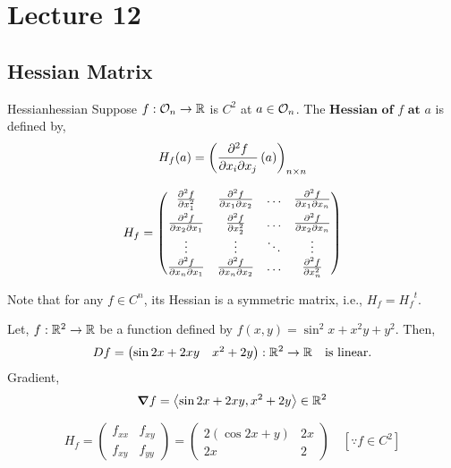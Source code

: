 \documentclass[../Analysis-3.tex]{subfiles}
\begin{document}
\chapter*{Lecture 12} %
\setcounter{chapter}{12} %
\setcounter{section}{0}

\section{Hessian Matrix}

\begin{Def}{Hessian}{hessian}
  Suppose $f : \mathcal{O}_{n} \to \mathbb{R}$ is $C^2$ at $a \in \mathcal{O}_{n} $. The $\textbf{Hessian of $f$ at $a$}$ is defined by, \[ H_f(a) = \left( \pdv{f}{x_i}{x_j}\left( a \right) \right)_{n \times n} \]
\end{Def}

\[ H_{f} = \begin{pmatrix}
    \pdv[2]{f}{x_1}   & \pdv{f}{x_1}{x_2} & \ldots & \pdv{f}{x_1}{x_n} \\[5pt]
    \pdv{f}{x_2}{x_1} & \pdv[2]{f}{x_2}   & \ldots & \pdv{f}{x_2}{x_n} \\
    \vdots            & \vdots            & \ddots & \vdots            \\
    \pdv{f}{x_n}{x_1} & \pdv{f}{x_n}{x_2} & \ldots & \pdv[2]{f}{x_n}
  \end{pmatrix} \]

Note that for any $ f \in C^n $, its Hessian is a symmetric matrix, i.e., $H_f = {H_f}^t$.

\begin{Eg}{}{}
  Let, $f : \mathbb{R}^2 \to \mathbb{R}$ be a function defined by $f(x,y) = \sin^2 x + x^2y + y^2$. Then,
  \[Df = \begin{pmatrix}
      \sin2x + 2xy & x^2 + 2y
    \end{pmatrix} :  \mathbb{R}^2 \to \mathbb{R} \quad \text{is linear.} \]
  Gradient, \[\grad f = \left\langle \sin2x + 2xy, x^2 + 2y \right\rangle \in \mathbb{R}^2 \]

  \[ H_f = \begin{pmatrix}
      f_{xx} & f_{xy} \\
      f_{xy} & f_{yy}
    \end{pmatrix} = \begin{pmatrix}
      2( \cos2x + y) & 2x \\
      2x             & 2
    \end{pmatrix} \quad [ \because  f \in C^2] \]

\end{Eg}
\end{document}
